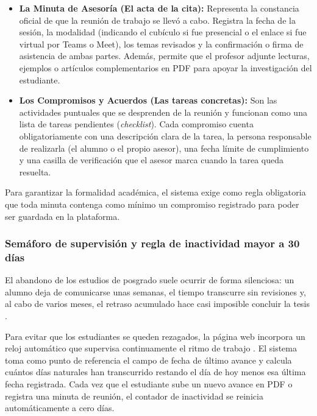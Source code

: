 \begin{itemize}
    \item \textbf{La Minuta de Asesoría (El acta de la cita):} Representa la constancia oficial de que la reunión de trabajo se llevó a cabo. Registra la fecha de la sesión, la modalidad (indicando el cubículo si fue presencial o el enlace si fue virtual por Teams o Meet), los temas revisados y la confirmación o firma de asistencia de ambas partes. Además, permite que el profesor adjunte lecturas, ejemplos o artículos complementarios en PDF para apoyar la investigación del estudiante.
    \item \textbf{Los Compromisos y Acuerdos (Las tareas concretas):} Son las actividades puntuales que se desprenden de la reunión y funcionan como una lista de tareas pendientes (\textit{checklist}). Cada compromiso cuenta obligatoriamente con una descripción clara de la tarea, la persona responsable de realizarla (el alumno o el propio asesor), una fecha límite de cumplimiento y una casilla de verificación que el asesor marca cuando la tarea queda resuelta.
\end{itemize}

Para garantizar la formalidad académica, el sistema exige como regla obligatoria que toda minuta contenga como mínimo un compromiso registrado para poder ser guardada en la plataforma.

\subsubsection{Semáforo de supervisión y regla de inactividad mayor a 30 días}
El abandono de los estudios de posgrado suele ocurrir de forma silenciosa: un alumno deja de comunicarse unas semanas, el tiempo transcurre sin revisiones y, al cabo de varios meses, el retraso acumulado hace casi imposible concluir la tesis \parencite{sim2023technology}.

Para evitar que los estudiantes se queden rezagados, la página web incorpora un reloj automático que supervisa continuamente el ritmo de trabajo \parencite{ali2024thesis}. El sistema toma como punto de referencia el campo de fecha de último avance y calcula cuántos días naturales han transcurrido restando el día de hoy menos esa última fecha registrada. Cada vez que el estudiante sube un nuevo avance en PDF o registra una minuta de reunión, el contador de inactividad se reinicia automáticamente a cero días.

